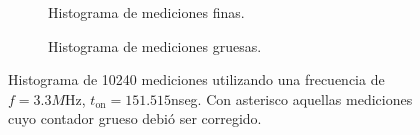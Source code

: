 \begin{figure}[H]
     \centering
     \begin{subfigure}[t]{0.45\textwidth} %
           \centering
           \caption{Histograma de mediciones finas.}
           \label{fig: histograma_66}
     \end{subfigure}%
     \hspace{10pt}%
     \begin{subfigure}[t]{0.4\textwidth} %
           \centering
           \caption{Histograma de mediciones gruesas.}
     \end{subfigure}
     \caption{Histograma de 10240 mediciones utilizando una frecuencia de $f=3.3M$Hz, $t_{\text{on}}=151.515$nseg. 
     Con asterisco aquellas mediciones cuyo contador grueso debió ser corregido.}
\end{figure}

